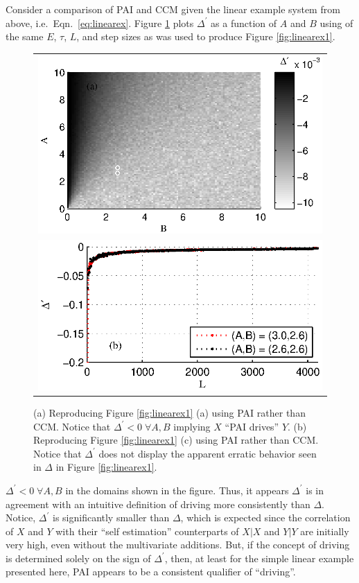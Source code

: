 \documentclass[twocolumn,aps,pre,groupedaddress]{revtex4-1}
\begin{document}
Consider a comparison of PAI and CCM given the linear example system from above, i.e.\ Eqn.\ \ref{eq:linearex}.  Figure \ref{fig:linearExPAI} plots $\Delta^\prime$ as a function of $A$ and $B$ using of the same $E$, $\tau$, $L$, and step sizes as was used to produce Figure \ref{fig:linearex1}.
\begin{figure}[ht]
\begin{tabular}{c}
\includegraphics[scale=0.8]{LinearExPAI.eps} \\
\includegraphics[scale=0.8]{LinearExPAIChangeL.eps} \\
\end{tabular}
\caption{(a) Reproducing Figure \ref{fig:linearex1} (a) using PAI rather than CCM.  Notice that $\Delta^\prime<0\;\forall A,B$ implying $X$ ``PAI drives'' $Y$. (b) Reproducing Figure \ref{fig:linearex1} (c) using PAI rather than CCM.  Notice that $\Delta^\prime$ does not display the apparent erratic behavior seen in $\Delta$ in Figure \ref{fig:linearex1}.}
\label{fig:linearExPAI}
\end{figure}
$\Delta^\prime<0\;\forall A,B$ in the domains shown in the figure.  Thus, it appears $\Delta^\prime$ is in agreement with an intuitive definition of driving more consistently than $\Delta$.  Notice, $\Delta^\prime$ is significantly smaller than $\Delta$, which is expected since the correlation of $X$ and $Y$ with their ``self estimation'' counterparts of $X|X$ and $Y|Y$ are initially very high, even without the multivariate additions.  But, if the concept of driving is determined solely on the sign of $\Delta^\prime$, then, at least for the simple linear example presented here, PAI appears to be a consistent qualifier of ``driving''.
\end{document}
